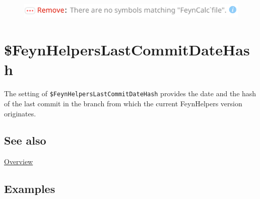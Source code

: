 \documentclass[../FeynHelpersManual.tex]{subfiles}
\begin{document}
\FloatBarrier
\begin{figure}[!ht]
\centering
\includegraphics[width=0.6\linewidth]{img/0fr2yhbgg9nsx.pdf}
\end{figure}
\FloatBarrier

\begin{Shaded}
\begin{Highlighting}[]
 
\end{Highlighting}
\end{Shaded}

\hypertarget{dollarfeynhelperslastcommitdatehash}{
\section{\$FeynHelpersLastCommitDateHash}\label{dollarfeynhelperslastcommitdatehash}}

The setting of \texttt{\$FeynHelpersLastCommitDateHash} provides the
date and the hash of the last commit in the branch from which the
current FeynHelpers version originates.

\subsection{See also}

\hyperlink{toc}{Overview}

\subsection{Examples}
\end{document}
